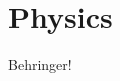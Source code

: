 \ifx\isEmbedded\undefined

\graphicspath{{../img/}}

\tableofcontents
\pagebreak

\fi

\section{Physics} \label{sec_physics}

Behringer!

\ifx\isEmbedded\undefined


\pagebreak

\fi